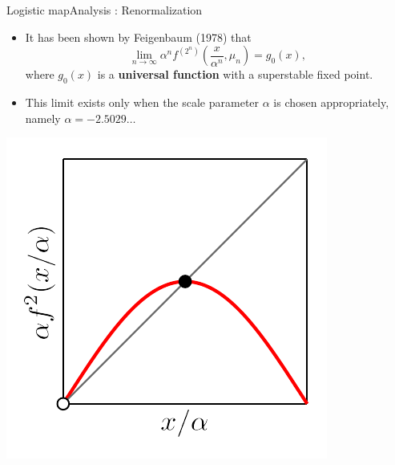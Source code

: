 \documentclass[usenames,dvipsnames,svgnames,10pt,aspectratio=169]{beamer}
\begin{document}
\begin{frame}[t, c]{Logistic map}{Analysis : Renormalization}
	\begin{minipage}{.68\textwidth}
		\begin{itemize}
			\item It has been shown by Feigenbaum (1978) that
			\[
				\lim_{n \to \infty} \alpha^n f^{(2^n)} \left( \frac{x}{\alpha^n}, \mu_n \right) = g_0(x),
			\]
			where \( g_0(x) \) is a \textbf{universal function} with a superstable fixed point.

			\bigskip

			\item This limit exists only when the scale parameter \( \alpha \) is chosen appropriately, namely \( \alpha = -2.5029\ldots \)
		\end{itemize}
	\end{minipage}%
	\hfill
	\begin{minipage}{.28\textwidth}
		\centering
		\includegraphics[width=\textwidth]{renormalization_3}
	\end{minipage}

	\vspace{1cm}
\end{frame}
\end{document}
